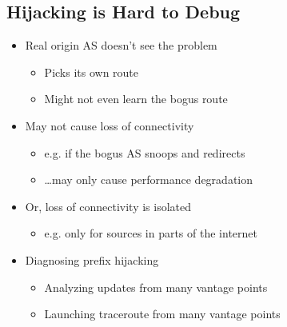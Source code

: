\subsection{Hijacking is Hard to Debug}
\begin{itemize}
    \item Real origin AS doesn't see the problem
          \begin{itemize}
              \item Picks its own route
              \item Might not even learn the bogus route
          \end{itemize}
    \item May not cause loss of connectivity
          \begin{itemize}
              \item e.g. if the bogus AS snoops and redirects
              \item \dots may only cause performance degradation
          \end{itemize}
    \item Or, loss of connectivity is isolated
          \begin{itemize}
              \item e.g. only for sources in parts of the internet
          \end{itemize}
    \item Diagnosing prefix hijacking
          \begin{itemize}
              \item Analyzing updates from many vantage points
              \item Launching traceroute from many vantage points
          \end{itemize}
\end{itemize}

